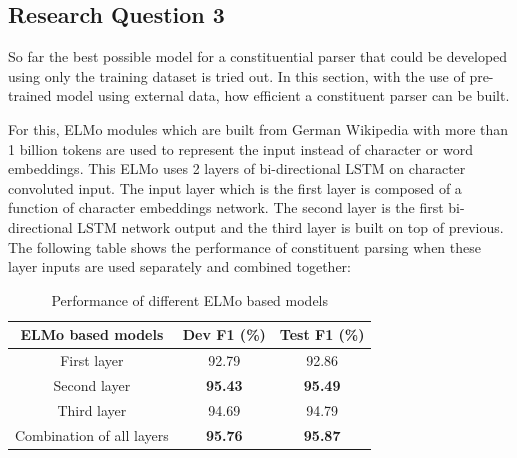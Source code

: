 \documentclass[a4paper, 11pt]{article}
\begin{document}


\subsection{Research Question 3}
So far the best possible model for a constituential parser that could be developed using only the training dataset is tried out. In this section, with the use of pre-trained model using external data, how efficient a constituent parser can be built.

For this, ELMo modules which are built from German Wikipedia with more than 1 billion tokens are used to represent the input instead of character or word embeddings. This ELMo uses 2 layers of bi-directional LSTM on character convoluted input. The input layer which is the first layer is composed of a function of character embeddings network. The second layer is the first bi-directional LSTM network output and the third layer is built on top of previous. The following table shows the performance of constituent parsing when these layer inputs are used separately and combined together:

\begin{table}[h!]
  \begin{center}
    \label{tab:different-elmo-models}
    \def\arraystretch{1.5}%
    \begin{tabular}{c|c|c}
      ELMo based models & Dev F1 (\%) & Test F1 (\%) \\
      \hline
	  First layer & 92.79 & 92.86\\
      Second layer  & \textbf{95.43} & \textbf{95.49}\\
      Third layer & 94.69 & 94.79\\
      Combination of all layers & \textbf{95.76} & \textbf{95.87}\\     
    \end{tabular}
    \caption{Performance of different ELMo based models}
  \end{center}
\end{table}
\end{document}
